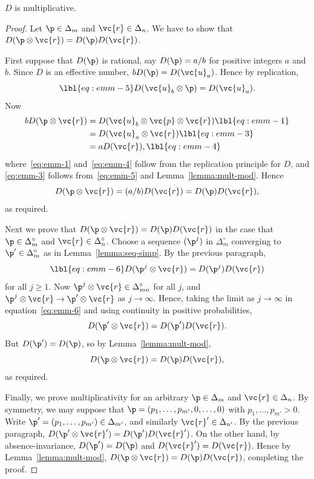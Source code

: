 \begin{lemma}
$D$ is multiplicative.
\end{lemma}

\begin{proof}
Let $\p \in \Delta_m$ and $\vc{r} \in \Delta_n$.  We have to show that
$D(\p \otimes \vc{r}) = D(\p)D(\vc{r})$.

First suppose that $D(\p)$ is rational, say $D(\p) = a/b$ for positive
integers $a$ and $b$.  Since $D$ is an effective number, $bD(\p) =
D(\vc{u}_a)$.  Hence by replication,
% 
\begin{equation}
\lbl{eq:emm-5}
D(\vc{u}_b \otimes \p) = D(\vc{u}_a).
\end{equation}
% 
Now
% 
\begin{align}
bD(\p \otimes \vc{r})   &
=
D(\vc{u}_b \otimes \vc{p} \otimes \vc{r})
\lbl{eq:emm-1}        \\
&
=
D(\vc{u}_a \otimes \vc{r})     
\lbl{eq:emm-3}        \\
&
=
aD(\vc{r}),
\lbl{eq:emm-4}
\end{align}
% 
where~\eqref{eq:emm-1} and~\eqref{eq:emm-4} follow from the replication
principle for $D$, 
and \eqref{eq:emm-3} follows from~\eqref{eq:emm-5} and
Lemma~\ref{lemma:mult-mod}.  Hence
\[
D(\p \otimes \vc{r})
=
(a/b) D(\vc{r})
=
D(\p) D(\vc{r}),
\]
as required.

Next we prove that $D(\p \otimes \vc{r}) = D(\p) D(\vc{r})$ in the case
that $\p \in \Delta_m^\circ$ and $\vc{r} \in \Delta_n^\circ$.  Choose a
sequence $(\p^j)$ in $\Delta_m^\circ$ converging to $\p' \in
\Delta_m^\circ$ as in Lemma~\ref{lemma:seq-simp}.  By the previous
paragraph,
% 
\begin{equation}
\lbl{eq:emm-6}
D(\p^j \otimes \vc{r}) = D(\p^j) D(\vc{r})  
\end{equation}
% 
for all $j \geq 1$.  Now $\p^j \otimes \vc{r} \in \Delta_{mn}^\circ$ for
all $j$, and $\p^j \otimes \vc{r} \to \p' \otimes \vc{r}$ as $j \to
\infty$.  Hence, taking the limit as $j \to \infty$ in
equation~\eqref{eq:emm-6} and using continuity in positive probabilities,
\[
D(\p' \otimes \vc{r}) = D(\p') D(\vc{r}).
\]
But $D(\p') = D(\p)$, so by Lemma~\ref{lemma:mult-mod}, 
\[
D(\p \otimes \vc{r}) = D(\p) D(\vc{r}),
\]
as required.  

Finally, we prove multiplicativity for an arbitrary $\p \in \Delta_m$ and
$\vc{r} \in \Delta_n$.  By symmetry, we may suppose that $\p = (p_1,
\ldots, p_{m'}, 0, \ldots, 0)$ with $p_1, \ldots, p_{m'} > 0$.  Write $\p'
= (p_1, \ldots, p_{m'}) \in \Delta_{m'}$, and similarly $\vc{r}' \in
\Delta_{n'}$.  By the previous paragraph, $D(\p' \otimes \vc{r}') = D(\p')
D(\vc{r}')$.  On the other hand, by absence-invariance, $D(\p') = D(\p)$
and $D(\vc{r}') = D(\vc{r})$.  Hence by Lemma~\ref{lemma:mult-mod}, $D(\p
\otimes \vc{r}) = D(\p) D(\vc{r})$, completing the proof.
\end{proof}

